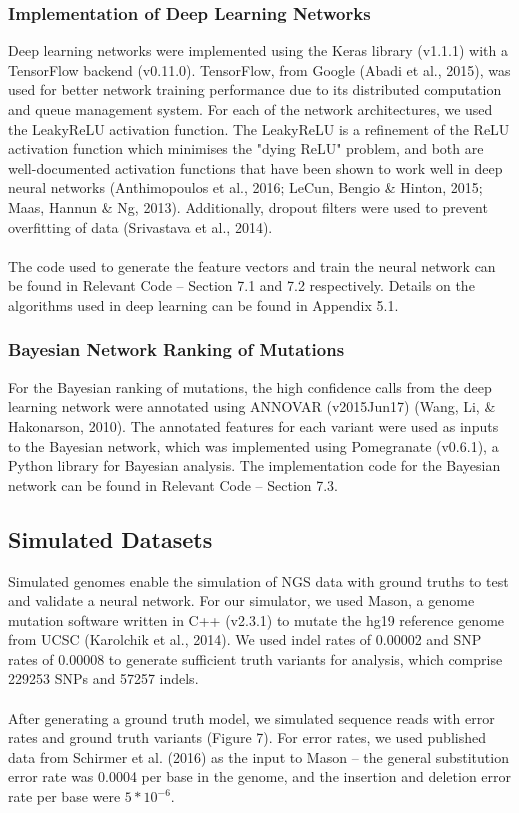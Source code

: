 \documentclass{article}
\begin{document}
\subsubsection{Implementation of Deep Learning Networks}
Deep learning networks were implemented using the Keras library (v1.1.1) with a TensorFlow backend (v0.11.0). TensorFlow, from Google (Abadi et al., 2015), was used for better network training performance due to its distributed computation and queue management system. For each of the network architectures, we used the LeakyReLU activation function. The LeakyReLU is a refinement of the ReLU activation function which minimises the "dying ReLU" problem, and both are well-documented activation functions that have been shown to work well in deep neural networks (Anthimopoulos et al., 2016; LeCun, Bengio \& Hinton, 2015; Maas, Hannun \& Ng, 2013). Additionally, dropout filters were used to prevent overfitting of data (Srivastava et al., 2014).\\\\
The code used to generate the feature vectors and train the neural network can be found in Relevant Code -- Section 7.1 and 7.2 respectively. Details on the algorithms used in deep learning can be found in Appendix 5.1.
\subsubsection{Bayesian Network Ranking of Mutations}
For the Bayesian ranking of mutations, the high confidence calls from the deep learning network were annotated using ANNOVAR (v2015Jun17) (Wang, Li, \& Hakonarson, 2010). The annotated features for each variant were used as inputs to the Bayesian network, which was implemented using Pomegranate (v0.6.1), a Python library for Bayesian analysis. The implementation code for the Bayesian network can be found in Relevant Code -- Section 7.3.
\subsection{Simulated Datasets}
Simulated genomes enable the simulation of NGS data with ground truths to test and validate a neural network. For our simulator, we used Mason, a genome mutation software written in C++ (v2.3.1) to mutate the hg19 reference genome from UCSC (Karolchik et al., 2014). We used indel rates of 0.00002 and SNP rates of 0.00008 to generate sufficient truth variants for analysis, which comprise 229253 SNPs and 57257 indels.\\\\
After generating a ground truth model, we simulated sequence reads with error rates and ground truth variants (Figure 7). For error rates, we used published data from Schirmer et al. (2016) as the input to Mason -- the general substitution error rate was 0.0004 per base in the genome, and the insertion and deletion error rate per base were $5*10^{-6}$.
\end{document}
